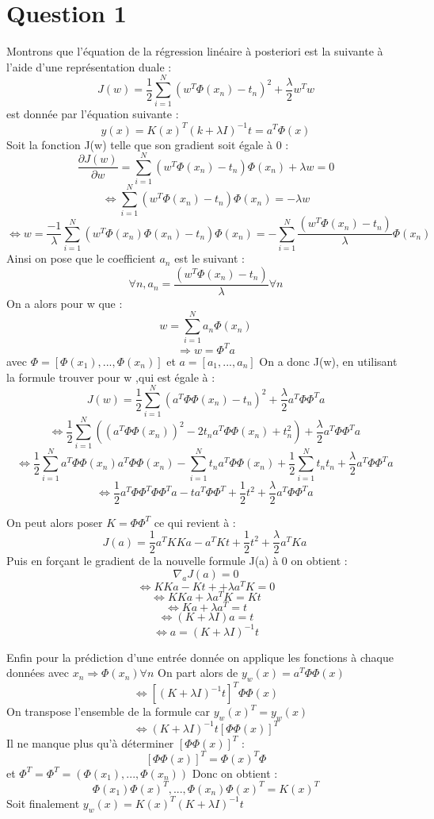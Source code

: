 \documentclass{article}
\begin{document}
\section{Question 1}
Montrons que l'équation de la régression linéaire à posteriori est la suivante à l'aide d'une représentation duale :
\[J( w) = \frac{1}{2} \sum_{i=1}^{N}( w^T \Phi(x_{n}) -t_{n} )^2 +\frac{\lambda}{2}w^T w \]
est donnée par l'équation suivante :
\[ y(x) = K(x)^T (k+ \lambda I)^{-1} t= a^T\Phi(x) \]
Soit la fonction J(w) telle que son gradient soit égale à 0 :
\[\frac{\partial J(w)}{\partial w} = \sum_{i=1}^{N}( w^T \Phi(x_{n}) -t_{n} )\Phi(x_{n})  +\lambda w = 0\]
\[\Leftrightarrow \sum_{i=1}^{N}( w^T \Phi(x_{n}) -t_{n} )\Phi(x_{n})  = -\lambda w \]
\[\Leftrightarrow w = \frac{-1}{\lambda}\sum_{i=1}^{N}( w^T\Phi(x_{n}) \Phi(x_{n}) -t_{n} )\Phi(x_{n}) = -\sum_{i=1}^{N}\frac{( w^T\Phi(x_{n})  -t_{n} )}{\lambda}\Phi(x_{n}) \]
Ainsi on pose que le coefficient $a_{n}$ est le suivant :
\[  \forall n, a_{n} = \frac{( w^T\Phi(x_{n})  -t_{n} )}{\lambda}  \forall n \]
On a alors pour w que :
\[w = \sum_{i=1}^{N} a_{n} \Phi(x_{n})\]
\[\Rightarrow w= \Phi^T a\]
avec $\Phi = [\Phi(x_{1}), ... ,\Phi(x_{n}) ]$ et $a = [a_{1}, ... ,a_{n} ] $
On a donc J(w), en utilisant la formule trouver pour w ,qui est égale à :
\[J( w) = \frac{1}{2} \sum_{i=1}^{N}( a^T\Phi \Phi(x_{n}) -t_{n} )^2 +\frac{\lambda}{2}a^T\Phi \Phi^T a\]
\[ \Leftrightarrow \frac{1}{2} \sum_{i=1}^{N} ((a^T\Phi \Phi(x_{n}) )^2 -2t_{n}a^T\Phi \Phi(x_{n}) + t_{n}^2 ) +\frac{\lambda}{2}a^T\Phi \Phi^T a\ \]
\[ \Leftrightarrow \frac{1}{2} \sum_{i=1}^{N} a^T\Phi \Phi(x_{n}) a^T\Phi \Phi(x_{n} )-\sum_{i=1}^{N}t_{n}a^T\Phi \Phi(x_{n}) + \frac{1}{2} \sum_{i=1}^{N}t_{n}t_{n}  +\frac{\lambda}{2}a^T\Phi \Phi^T a\ \]
\[ \Leftrightarrow \frac{1}{2}  a^T\Phi \Phi^T\Phi \Phi^T a - t a^T\Phi \Phi^T + \frac{1}{2} t^2  +\frac{\lambda}{2}a^T\Phi \Phi^T a\ \]

On peut alors poser $K=\Phi \Phi^T $ ce qui revient à :
\[ J(a) =\frac{1}{2}  a^T K K a -  a^T K t+ \frac{1}{2} t^2  +\frac{\lambda}{2}a^T K a\ \]
Puis en forçant le gradient de la nouvelle formule J(a) à 0 on obtient :
\[\nabla_{a} J(a)= 0\]
\[\Leftrightarrow   K K a -   K t+   +\lambda a^T K = 0 \]
\[ \Leftrightarrow K K a + \lambda a^T K = Kt \]
\[ \Leftrightarrow  K a + \lambda a^T  = t\]
\[ \Leftrightarrow  (K  + \lambda I)a  = t\]
\[ \Leftrightarrow  a  = (K  + \lambda I)^{-1}t\]

Enfin pour la prédiction d'une entrée donnée on applique les fonctions à chaque données avec $x_{n} \Rightarrow \Phi(x_{n}) \forall n$
On part alors de $y_{w}(x) = a^T \Phi \Phi(x)$
\[ \Leftrightarrow [ (K  + \lambda I)^{-1}t]^T\Phi \Phi(x)\]
On transpose l'ensemble de la formule car $y_{w}(x)^T=y_{w}(x)$
\[ \Leftrightarrow (K  + \lambda I)^{-1}t[\Phi \Phi(x)]^T\]
Il ne manque plus qu'à déterminer $[\Phi \Phi(x)]^T$ :
\[[\Phi \Phi(x)]^T =\Phi(x)^T \Phi \]
et $\Phi^T= \Phi^T=(\Phi(x_{1}),...,\Phi(x_{n}))$
Donc on obtient :
\[\Phi(x_{1})\Phi(x)^T,...,\Phi(x_{n})\Phi(x)^T = K(x)^T\]
Soit finalement $y_{w}(x) = K(x)^T(K  + \lambda I)^{-1}t$
\end{document}
